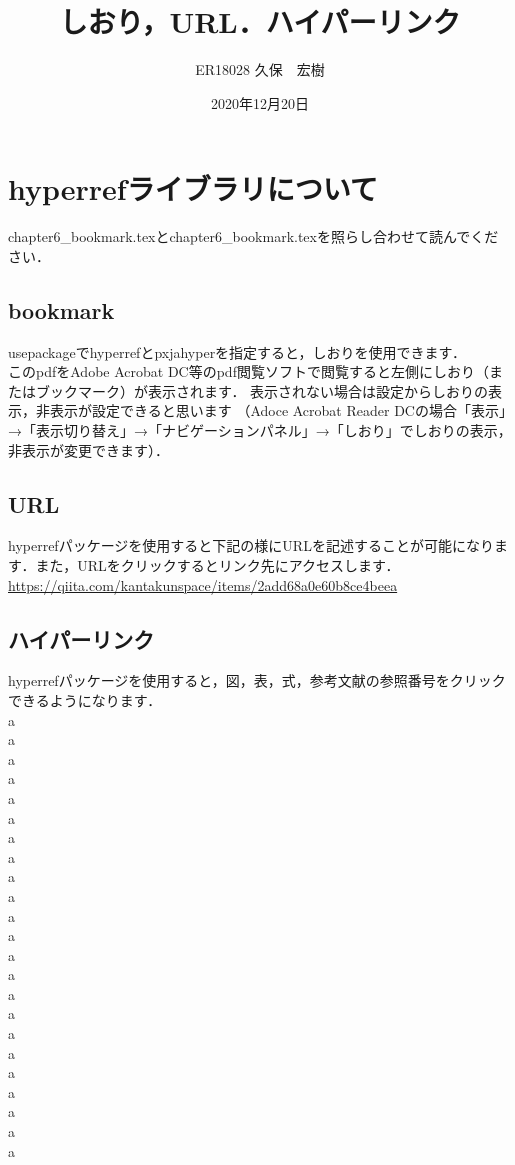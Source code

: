 \documentclass[a4paper,10pt]{jsarticle}
\title{しおり，URL．ハイパーリンク}%
\author{ER18028 久保　宏樹}%
\date{2020年12月20日}%
\begin{document}
\maketitle%
\section{hyperrefライブラリについて}
chapter6\_bookmark.texとchapter6\_bookmark.texを照らし合わせて読んでください．
\subsection{bookmark}
usepackageでhyperrefとpxjahyperを指定すると，しおりを使用できます．\\

このpdfをAdobe Acrobat DC等のpdf閲覧ソフトで閲覧すると左側にしおり（またはブックマーク）が表示されます．
表示されない場合は設定からしおりの表示，非表示が設定できると思います
（Adoce Acrobat Reader DCの場合「表示」→「表示切り替え」→「ナビゲーションパネル」→「しおり」でしおりの表示，非表示が変更できます）．

\subsection{URL}
hyperrefパッケージを使用すると下記の様にURLを記述することが可能になります．また，URLをクリックするとリンク先にアクセスします．\\
\url{https://qiita.com/kantakunspace/items/2add68a0e60b8ce4beea}
\subsection{ハイパーリンク}
hyperrefパッケージを使用すると，図，表，式，参考文献の参照番号をクリックできるようになります．\\
a\\
a\\
a\\
a\\
a\\
a\\
a\\
a\\
a\\
a\\
a\\
a\\
a\\
a\\
a\\
a\\
a\\
a\\
a\\
a\\
a\\
a\\
a\\
\end{document}
